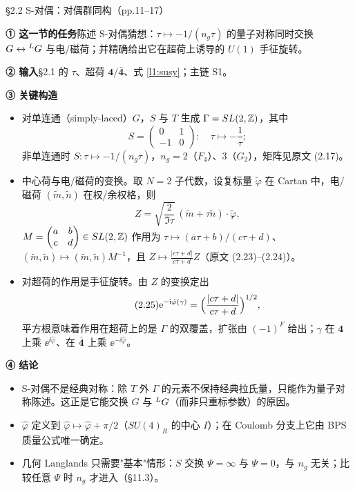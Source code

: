 \begin{kcard}{§2.2 S-对偶：对偶群同构（pp.11--17）}

\noindent\textbf{① 这一节的任务}\quad 陈述 S-对偶猜想：$\tau\mapsto-1/(n_g\tau)$ 的量子对称同时交换 $G\leftrightarrow{}^{L}G$ 与电/磁荷；并精确给出它在超荷上诱导的 $U(1)$ 手征旋转。\pA{}

\noindent\textbf{② 输入}\quad \S2.1 的 $\tau$、超荷 $\mathbf 4/\bar{\mathbf 4}$、式 \eqref{l1:susy}；主链 S1。

\noindent\textbf{③ 关键构造}\quad
\begin{itemize}
\item 对单连通（simply-laced）$G$，$S$ 与 $T$ 生成 $\Gamma=SL(2,\mathbb{Z})$，其中
\begin{equation}\label{l1:smat}\tag{2.16}
S=\begin{pmatrix}0&1\\-1&0\end{pmatrix}:\quad \tau\longmapsto-\frac1\tau ;
\end{equation}
非单连通时 $S:\tau\mapsto-1/(n_g\tau)$，$n_g=2$（$F_4$）、$3$（$G_2$），矩阵见原文 (2.17)。\pA{}
\item 中心荷与电/磁荷的变换。取 $N=2$ 子代数，设复标量 $\tilde\varphi$ 在 Cartan 中，电/磁荷 $(\tilde m,\tilde n)$ 在权/余权格，则
\begin{equation}\label{l1:Z}\tag{2.22}
Z=\sqrt{\frac{2}{\Im\tau}}\,(\tilde m+\tau\tilde n)\cdot\tilde\varphi,
\end{equation}
$M=\begin{pmatrix}a&b\\c&d\end{pmatrix}\in SL(2,\mathbb{Z})$ 作用为 $\tau\mapsto(a\tau+b)/(c\tau+d)$、$(\tilde m,\tilde n)\mapsto(\tilde m,\tilde n)M^{-1}$，且 $Z\mapsto\frac{|c\tau+d|}{c\tau+d}Z$（原文 (2.23)--(2.24)）。\pA{}
\item 对超荷的作用是手征旋转。由 $Z$ 的变换定出
\begin{equation}\label{l1:phase}\tag{2.25}
\mathrm{e}^{-\mathrm{i}\hat\varphi(\gamma)}=\Bigl(\frac{|c\tau+d|}{c\tau+d}\Bigr)^{1/2},
\end{equation}
平方根意味着作用在超荷上的是 $\Gamma$ 的双覆盖，扩张由 $(-1)^F$ 给出；$\gamma$ 在 $\mathbf 4$ 上乘 $\ee^{\ii\hat\varphi}$、在 $\bar{\mathbf 4}$ 上乘 $\ee^{-\ii\hat\varphi}$。\pA{}
\end{itemize}

\noindent\textbf{④ 结论}\quad
\begin{itemize}
\item S-对偶不是经典对称：除 $T$ 外 $\Gamma$ 的元素不保持经典拉氏量，只能作为量子对称陈述。这正是它能交换 $G$ 与 ${}^{L}G$（而非只重标参数）的原因。\pA{}
\item $\hat\varphi$ 定义到 $\hat\varphi\mapsto\hat\varphi+\pi/2$（$SU(4)_R$ 的中心 $I$）；在 Coulomb 分支上它由 BPS 质量公式唯一确定。\pA{}
\item 几何 Langlands 只需要"基本"情形：$S$ 交换 $\Psi=\infty$ 与 $\Psi=0$，与 $n_g$ 无关；比较任意 $\Psi$ 时 $n_g$ 才进入（\S11.3）。\pA{}
\end{itemize}


\end{kcard}
